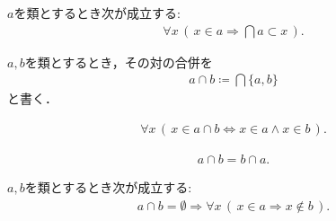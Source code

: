 	\begin{screen}
		\begin{thm}[交叉は任意の元に含まれる]
			$a$を類とするとき次が成立する:
			\begin{align}
				\forall x\, (\, x \in a \Longrightarrow \bigcap a \subset x\, ).
			\end{align}
		\end{thm}
	\end{screen}
	
	$a,b$を類とするとき，その対の合併を
	\begin{align}
		a \cap b \coloneqq \bigcap \{a,b\}
	\end{align}
	と書く．
	
	\begin{screen}
		\begin{thm}
			\begin{align}
				\forall x\, (\, x \in a \cap b \Longleftrightarrow x \in a \wedge x \in b\, ).
			\end{align}
		\end{thm}
	\end{screen}
	
	\begin{screen}
		\begin{thm}[交叉の可換律]
			\begin{align}
				a \cap b = b \cap a.
			\end{align}
		\end{thm}
	\end{screen}
	
	\begin{screen}
		\begin{thm}[対の交叉が空ならばその構成要素は共通元を持たない]
		\label{thm:if_pair_is_empty_then_its_members_do_not_intersect}
			$a,b$を類とするとき次が成立する:
			\begin{align}
				a \cap b = \emptyset \Longrightarrow \forall x\, (\, x \in a \Longrightarrow x \notin b\, ).
			\end{align}
		\end{thm}
	\end{screen}
	
